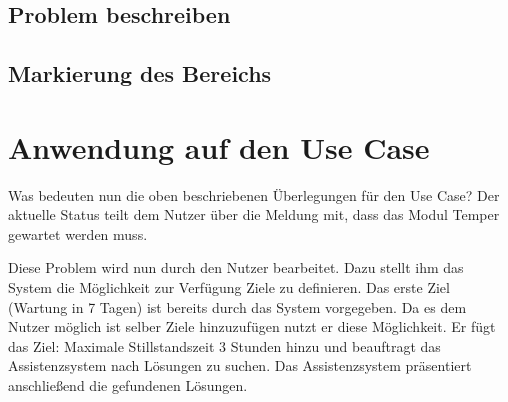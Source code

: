 \subsection{Problem beschreiben}


\subsection{Markierung des Bereichs}

\section{Anwendung auf den Use Case}
Was bedeuten nun die oben beschriebenen Überlegungen für den Use Case? Der aktuelle Status teilt dem Nutzer über die Meldung mit, dass das Modul Temper gewartet werden muss. 

Diese Problem wird nun durch den Nutzer bearbeitet. Dazu stellt ihm das System die Möglichkeit zur Verfügung Ziele zu definieren. Das erste Ziel (Wartung in 7 Tagen) ist bereits durch das System vorgegeben. Da es dem Nutzer möglich ist selber Ziele hinzuzufügen nutzt er diese Möglichkeit. Er fügt das Ziel: Maximale Stillstandszeit 3 Stunden hinzu und beauftragt das Assistenzsystem nach Lösungen zu suchen. Das Assistenzsystem präsentiert anschließend die gefundenen Lösungen. 